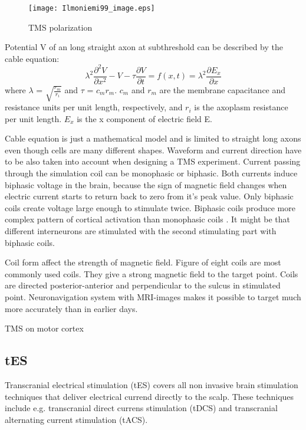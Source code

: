 \documentclass[english,12pt,a4paper,dvips]{article}
\begin{document}
\begin{figure}[here]
\texttt{[image: Ilmoniemi99\_image.eps]}
\caption{TMS polarization}
\label{fig:tms}
\end{figure}

Potential V of an long straight axon at subthreshold can be described by the cable equation:
\begin{equation}
 \lambda ^2 \frac{\partial ^2 V}{\partial x^2} - V - \tau \frac{\partial V}{\partial t} = f(x, t) = 
\lambda ^2 \frac{\partial E_x}{\partial x}
\end{equation} 
where $\lambda$ = $\sqrt{\frac{r_m}{r_i}}$ and $\tau$ = $c_m r_m$. $c_m$ and $r_m$ are the membrane 
capacitance and resistance units per unit length, respectively, and $r_i$ is the axoplasm resistance per unit length. $E_x$ is the x component of electric field E. \cite{wagner07}

Cable equation is just a mathematical model and is limited to straight long axons even though cells are many different shapes. Waveform and current direction have to be also taken into account when designing a TMS experiment. Current passing through the simulation coil can be monophasic or biphasic. Both currents induce biphasic voltage in the brain, because the sign of magnetic field changes when electric current starts to return back to zero from it's peak value. Only biphasic coils create voltage large enough to stimulate twice. Biphasic coils produce more complex pattern of cortical activation than monophasic coils \cite{dilazzaro04}. It might be that different interneurons are stimulated with the second stimulating part with biphasic coils.  

Coil form affect the strength of magnetic field. Figure of eight coils are most commonly used coils. They give a strong magnetic field to the target point. 
Coils are directed posterior-anterior and perpendicular to the sulcus in stimulated point. Neuronavigation system with MRI-images makes it possible to target much more accurately than in earlier days. 

TMS on motor cortex

\subsection{tES}

Transcranial electrical stimulation (tES) covers all non invasive brain stimulation techniques that deliver electrical currend directly to the scalp. These techniques include e.g. transcranial direct currens stimulation (tDCS) and transcranial alternating current stimulation (tACS). 
\end{document}
